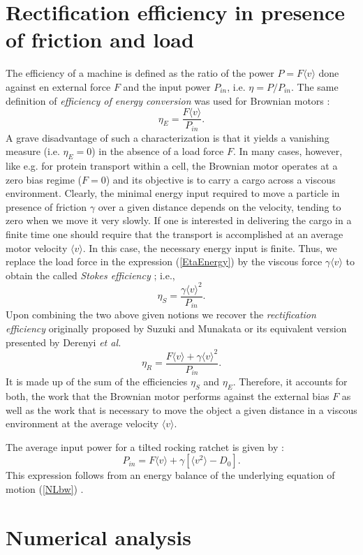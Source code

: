 \documentclass{elsart}
\def\be{\begin{equation}}
\def\ee#1{\label{#1}\end{equation}}
\def\la{\langle}
\def\ra{\rangle}
\def\mv{\la v \ra}
\def\mvv{\la v^2 \ra}
\begin{document}
\section{Rectification efficiency in presence of friction and load}
\label{sec:efficiency} The efficiency of a machine is defined as the
ratio of the power $P=F\mv$ done against en external force $F$ and
the input power $P_{in}$, i.e. $\eta = P/P_{in}$.  The same
definition of {\it efficiency of energy conversion} was used for
Brownian motors
\cite{Reimann:Ratchets,ReiHan2002,Linke2002,Zhou96,sekimoto97}:
%
\be \eta_{E} = \frac{F\mv}{P_{in}}.  \ee{EtaEnergy}
%
A grave disadvantage of such a characterization is that it yields a
vanishing measure (i.e. $\eta_{E} = 0$) in the absence of a load
force $F$. In many cases, however, like e.g. for protein transport
within a cell, the Brownian motor operates at a zero bias regime
($F=0$) and its objective is to carry a cargo across a viscous
environment. Clearly, the minimal energy input required to move a
particle in presence of friction $\gamma$ over a given distance
depends on the velocity, tending to zero when we move it very
slowly. If one is interested in delivering the cargo in a finite
time one should require that the transport is accomplished at an
average motor velocity $\mv$. In this case, the necessary energy
input is finite. Thus, we replace the load force in the expression
(\ref{EtaEnergy}) by the viscous force $\gamma\mv$ to obtain the
called {\it Stokes efficiency} \cite{wang}; i.e.,
%
\be \eta_{S} = \frac{\gamma \mv^2}{P_{in}}.  \ee{EtaStokes}
%
Upon combining the two above given notions we recover the {\it
  rectification efficiency} originally proposed by Suzuki and Munakata
\cite{munakata,munakata2005} or its equivalent version presented by
Derenyi {\it et al.} \cite{Derenyi1999}
%
\be \eta_{R} = \frac{F \mv + \gamma
  \mv^2}{P_{in}}.  \ee{EtaRec}
%
It is made up of the sum of the efficiencies $\eta_{S}$ and
$\eta_{E}$. Therefore, it accounts for both, the work that the
Brownian motor performs against the external bias $F$ as well as the
work that is necessary to move the object a given distance in a
viscous environment at the average velocity $\mv$.

The average input power for a tilted rocking ratchet is given by
\cite{machura1,machura2,Linke2005}: \be P_{in} = F \mv + \gamma [
\mvv - D_0 ].  \ee{Pin} This expression  follows from an energy
balance of the underlying equation of motion (\ref{NLbw})
\cite{machura1}.


\section{Numerical analysis }
\label{results}
\end{document}
